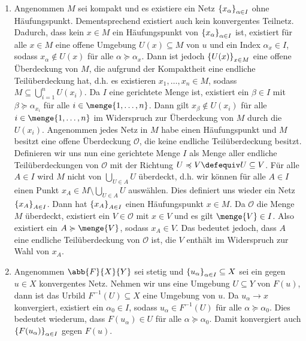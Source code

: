 \begin{exercisePage}
\begin{enumerate}[leftmargin=\zulength, label=(zu \alph*)]
		\item \begin{proof-equivalence}
			\hinrichtung Angenommen $M$ sei kompakt und es existiere ein Netz $\left\{ x_\alpha \right\}_{\alpha \in I}$ ohne Häufungspunkt. Dementsprechend existiert auch kein konvergentes Teilnetz. Dadurch, dass kein $x \in M$ ein Häufungspunkt von $\left\{ x_\alpha \right\}_{\alpha \in I}$ ist, existiert für alle $x \in M$ eine offene Umgebung $U(x) \subseteq M$ von $u$ und ein Index $\alpha_x \in I$, sodass $x_\alpha \notin U(x)$ für alle $\alpha \succcurlyeq \alpha_x$. Dann ist jedoch $\left\{ U(x) \right\}_{x \in M}$ eine offene Überdeckung von $M$, die aufgrund der Kompaktheit eine endliche Teilüberdeckung hat, d.h. es existieren $x_1, \dots, x_n \in M$, sodass $M \subseteq \bigcup_{i = 1}^n U(x_i)$. Da $I$ eine gerichtete Menge ist, existiert ein $\beta \in I$ mit $\beta \succcurlyeq \alpha_{x_i}$ für alle $i \in \menge{1,\dots,n}$. Dann gilt $x_\beta \notin U(x_i)$ für alle $i \in \menge{1,\dots,n}$ im Widerspruch zur Überdeckung von $M$ durch die $U(x_i)$.
			\rueckrichtung Angenommen jedes Netz in $M$ habe einen Häufungspunkt und $M$ besitzt eine offene Überdeckung $\mathcal{O}$, die keine endliche Teilüberdeckung besitzt. Definieren wir uns nun eine gerichtete Menge $I$ als Menge aller endliche Teilüberdeckungen von $\mathcal{O}$ mit der Richtung $U \preccurlyeq V \defequiv U \subseteq V$. Für alle $A \in I$ wird $M$ nicht von $\bigcup_{U \in A} U$ überdeckt, d.h. wir können für alle $A \in I$ einen Punkt $x_A \in M \setminus \bigcup_{U \in A} U$ auswählen. Dies definiert uns wieder ein Netz $\left\{ x_A \right\}_{A \in I}$. Dann hat $\left\{ x_A \right\}_{A \in I}$ einen Häufungspunkt $x \in M$. Da $\mathcal{O}$ die Menge $M$ überdeckt, existiert ein $V \in \mathcal{O}$ mit $x \in V$ und es gilt $\menge{V} \in I$. Also existiert ein $A \succcurlyeq \menge{V}$, sodass $x_A \in V$. Das bedeutet jedoch, dass $A$ eine endliche Teilüberdeckung von $\mathcal{O}$ ist, die $V$ enthält im Widerspruch zur Wahl von $x_A$.
		\end{proof-equivalence}
		\item \begin{proof-equivalence}
			\hinrichtung Angenommen $\abb{F}{X}{Y}$ sei stetig und $\left\{ u_\alpha \right\}_{\alpha \in I} \subseteq X$ sei ein gegen $u \in X$ konvergentes Netz. Nehmen wir uns eine Umgebung $U \subseteq Y$ von $F(u)$, dann ist das Urbild $F^{-1}(U) \subseteq X$ eine Umgebung von $u$. Da $u_\alpha \to  x$ konvergiert, existiert ein $\alpha_0 \in I$, sodass $u_\alpha \in F^{-1}(U)$ für alle $\alpha \succcurlyeq \alpha_0$. Dies bedeutet wiederum, dass $F(u_\alpha) \in U$ für alle $\alpha \succcurlyeq \alpha_0$. Damit konvergiert auch $\left\{ F(u_\alpha) \right\}_{\alpha \in I}$ gegen $F(u)$. 

\end{proof-equivalence}
\end{enumerate}
\end{exercisePage}
